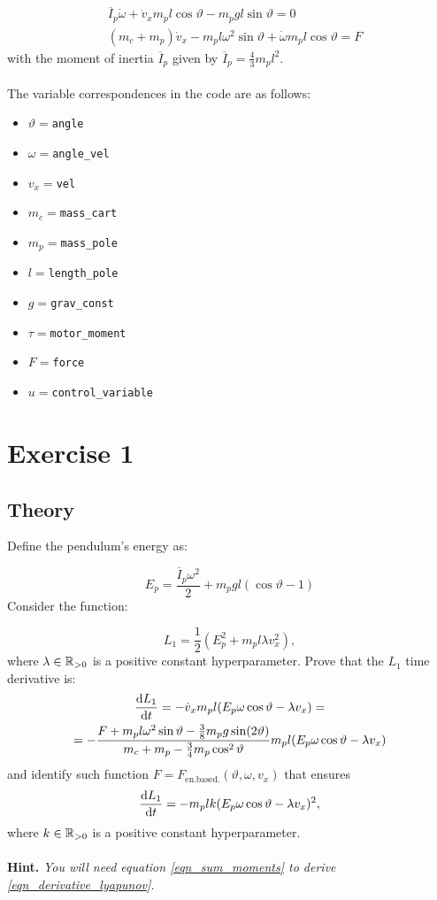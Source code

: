 \documentclass[12pt]{article}
\begin{document}
\begin{eqnarray}
\label{eqn_sum_moments}
& \overline{I}_p \dot{\omega} + \dot{v}_x m_p l\cos \vartheta  - m_p g l \sin \vartheta = 0 \\ 
\label{eqn_2nd_newton_law}
& (m_c + m_p) \dot{v}_x - m_p l \omega^2 \sin \vartheta + \dot{\omega} m_p l \cos \vartheta  = F
\end{eqnarray}
with the moment of inertia $\overline{I}_p$ given by $\overline{I}_p  = \frac{4}{3}m_p l ^ 2 $.
\\
\\
The variable correspondences in the code are as follows:
\begin{itemize}
    \item $\vartheta=$\texttt{angle}
    \item $\omega=$\texttt{angle\_vel}
    \item $v_x=$\texttt{vel}
    \item $m_c=$\texttt{mass\_cart}
    \item $m_p=$\texttt{mass\_pole}
    \item $l=$\texttt{length\_pole}
    \item $g=$\texttt{grav\_const}
    \item $\tau=$\texttt{motor\_moment}
    \item $F=$\texttt{force}
    \item $u=$\texttt{control\_variable}
\end{itemize}
\section*{Exercise 1}
\subsection*{Theory}
Define the pendulum's energy as:

$$
E_p =  \frac{\overline{I}_p \omega ^ 2}{2}   + m_p g l (\cos{\vartheta} - 1)
$$
Consider the function:

\begin{equation}
    L_1 = \frac{1}{2}(E_p^2 + m_p l\lambda v_x ^ 2),
\end{equation}
where $\lambda \in {\mathbb{R}}_{> 0}$ is a positive constant hyperparameter. 
Prove that the $L_1$ time derivative is: 
\begin{multline}
\label{eqn_derivative_lyapunov}
\frac{\mathop{}\!\mathrm{d} L_1}{\mathop{}\!\mathrm{d} t} = - \dot{v}_x m_p l (E_p \omega \cos \vartheta - \lambda v_x) = \\ 
= -\frac{F + m_p l \omega ^2 \sin{\vartheta} - \frac{3}{8}m_p g\sin(2\vartheta)}{m_c + m_p - \frac{3}{4} m_p \cos ^ 2 \vartheta} m_p l (E_p \omega \cos \vartheta - \lambda v_x)
\end{multline}
and identify such function $F = F_{\text{en.based.}}(\vartheta, \omega, v_x)$ that ensures 
$$
\frac{\mathop{}\!\mathrm{d} L_1}{\mathop{}\!\mathrm{d} t} = - m_p lk (E_p\omega \cos \vartheta  - \lambda v_x)^2,
$$
where $k\in {\mathbb{R}}_{> 0}$ is a positive constant hyperparameter.
\\
\\
\textbf{Hint.} \textit{You will need equation \eqref{eqn_sum_moments} to derive \eqref{eqn_derivative_lyapunov}.}
\end{document}
